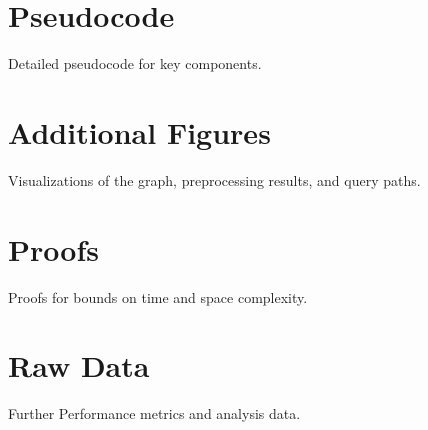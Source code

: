 \cleardoublepage
{}
\begin{appendices}
	\section{Pseudocode}
		Detailed pseudocode for key components.
	\section{Additional Figures}
		Visualizations of the graph, preprocessing results, and query paths.
	\section{Proofs}
		Proofs for bounds on time and space complexity.
	\section{Raw Data}
		Further Performance metrics and analysis data.
		
\end{appendices}